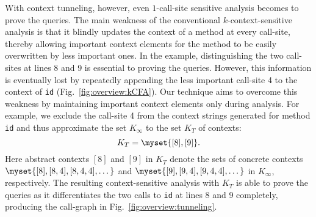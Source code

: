 With context tunneling, however, even $1$-call-site sensitive analysis
becomes to prove the queries.
The main weakness of the conventional
$k$-context-sensitive analysis is that it blindly updates the context
of a method at every call-site, thereby allowing important context
elements for the method to be easily overwritten by less important
ones.  In the example, distinguishing the two call-sites
at lines 8 and 9 is essential to proving the queries. However, this
information is eventually lost by repeatedly appending the less
important call-site 4 to the context of {\tt id}
(Fig.~\ref{fig:overview:kCFA}).
Our technique aims to overcome this weakness by maintaining important
context elements only during analysis. For example, we exclude the
call-site 4 from the context strings generated for method {\tt id} and
thus approximate the set $K_{\infty}$ to the set $K_T$ of contexts:
\[
K_T = \myset{[8], [9]}.
\]
Here abstract contexts $[8]$ and $[9]$ in $K_{T}$ denote the sets of concrete contexts
$\myset{[8], [8,4], [8,4,4], \dots}$ and
$\myset{[9], [9,4], [9,4,4], \dots}$ in $K_{\infty}$, respectively. The resulting
context-sensitive analysis with $K_{T}$ is able to prove the queries as it differentiates the two calls
to {\tt id} at lines 8 and 9 completely, producing the call-graph in
Fig.~\ref{fig:overview:tunneling}.


